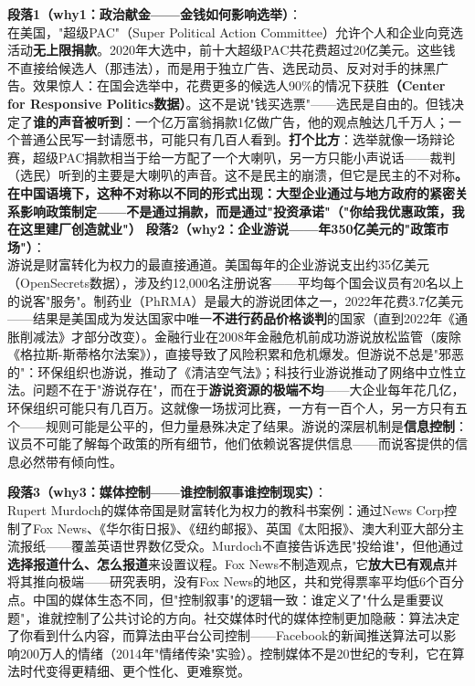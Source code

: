 \documentclass[../main.tex]{subfiles}
\begin{document}
	\textbf{段落1（why1：政治献金——金钱如何影响选举）}：\\
在美国，"超级PAC"（Super Political Action Committee）允许个人和企业向竞选活动\textbf{无上限捐款}。2020年大选中，前十大超级PAC共花费超过20亿美元。这些钱不直接给候选人（那违法），而是用于独立广告、选民动员、反对对手的抹黑广告。效果惊人：在国会选举中，花费更多的候选人90\%的情况下获胜\textbf{（Center for Responsive Politics数据）}。这不是说"钱买选票"——选民是自由的。但钱决定了\textbf{谁的声音被听到}：一个亿万富翁捐款1亿做广告，他的观点触达几千万人；一个普通公民写一封请愿书，可能只有几百人看到。\textbf{打个比方}：选举就像一场辩论赛，超级PAC捐款相当于给一方配了一个大喇叭，另一方只能小声说话——裁判（选民）听到的主要是大喇叭的声音。这不是民主的崩溃，但它是民主的不对称\textbf{。在中国语境下，这种不对称以不同的形式出现：大型企业通过与地方政府的紧密关系影响政策制定——不是通过捐款，而是通过"投资承诺"（"你给我优惠政策，我在这里建厂创造就业"）}
	\textbf{段落2（why2：企业游说——年350亿美元的"政策市场"）}：\\
	游说是财富转化为权力的最直接通道。美国每年的企业游说支出约35亿美元（OpenSecrets数据），涉及约12,000名注册说客——平均每个国会议员有20名以上的说客"服务"。制药业（PhRMA）是最大的游说团体之一，2022年花费3.7亿美元——结果是美国成为发达国家中唯一\textbf{不进行药品价格谈判}的国家（直到2022年《通胀削减法》才部分改变）。金融行业在2008年金融危机前成功游说放松监管（废除《格拉斯-斯蒂格尔法案》），直接导致了风险积累和危机爆发。但游说不总是"邪恶的"：环保组织也游说，推动了《清洁空气法》；科技行业游说推动了网络中立性立法。问题不在于"游说存在"，而在于\textbf{游说资源的极端不均}——大企业每年花几亿，环保组织可能只有几百万。这就像一场拔河比赛，一方有一百个人，另一方只有五个——规则可能是公平的，但力量悬殊决定了结果。游说的深层机制是\textbf{信息控制}：议员不可能了解每个政策的所有细节，他们依赖说客提供信息——而说客提供的信息必然带有倾向性。

	\textbf{段落3（why3：媒体控制——谁控制叙事谁控制现实）}：\\
	Rupert Murdoch的媒体帝国是财富转化为权力的教科书案例：通过News Corp控制了Fox News、《华尔街日报》、《纽约邮报》、英国《太阳报》、澳大利亚大部分主流报纸——覆盖英语世界数亿受众。Murdoch不直接告诉选民"投给谁"，但他通过\textbf{选择报道什么、怎么报道}来设置议程。Fox News不制造观点，它\textbf{放大已有观点}并将其推向极端——研究表明，没有Fox News的地区，共和党得票率平均低6个百分点。中国的媒体生态不同，但"控制叙事"的逻辑一致：谁定义了"什么是重要议题"，谁就控制了公共讨论的方向。社交媒体时代的媒体控制更加隐蔽：算法决定了你看到什么内容，而算法由平台公司控制——Facebook的新闻推送算法可以影响200万人的情绪（2014年"情绪传染"实验）。控制媒体不是20世纪的专利，它在算法时代变得更精细、更个性化、更难察觉。
\end{document}
